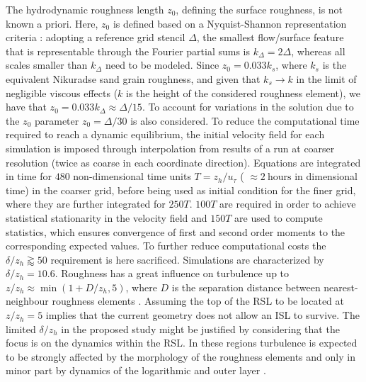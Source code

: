 	The hydrodynamic roughness length $z_0$, defining the surface roughness, is not known a priori. Here, $z_0$ is defined based on a Nyquist-Shannon representation criteria \citep{Shannon1949}: adopting a reference grid stencil $\Delta$, the smallest flow/surface feature that is representable through the Fourier partial sums is $k_{\Delta} = 2\Delta$, whereas all scales smaller than $k_{\Delta}$ need to be modeled. 
	Since $z_0 = 0.033 k_s$, where $k_s$ is the equivalent Nikuradse sand grain roughness, and given that $k_s \rightarrow k$ in the limit of negligible viscous effects ($k$ is the height of the considered roughness element), we have that $z_0 = 0.033 k_{\Delta} \approx \Delta/15$. 
	To account for variations in the solution due to the $z_0$ parameter $z_0= \Delta / 30$ is also considered.
	To reduce the computational time required to reach a dynamic equilibrium, the initial velocity field for each simulation is imposed through interpolation from results of a run at coarser resolution (twice as coarse in each coordinate direction). 
	Equations are integrated in time for $480$ non-dimensional time units $T = z_h/u_{\tau}$ ( $\approx 2 \ \mathrm{hours}$ in dimensional time) in the coarser grid, before being used as initial condition for the finer grid, where they are further integrated for $250T$. 
$100T$ are required in order to achieve statistical stationarity in the velocity field and $150T$ are used to compute statistics, which ensures convergence of first and second order moments to the corresponding expected values.
	To further reduce computational costs the $\delta/z_h \gtrapprox 50$ requirement \citep{Jimenez2004} is here sacrificed. Simulations are characterized by $\delta/z_h = 10.6$. Roughness has a great influence on turbulence up to ${z/z_h \approx \min(1+D/z_h,5)}$, where $D$ is the separation distance between nearest-neighbour roughness elements \citep{Raupach1981, Jimenez2004}. Assuming the top of the RSL to be located at $z/z_h=5$ implies that the current geometry does not allow an ISL to survive. 
	The limited $\delta /z_h$ in the proposed study might be justified by considering that the focus is on the dynamics within the RSL.
In these regions turbulence is expected to be strongly affected by the morphology of the roughness elements and only in minor part by dynamics of the logarithmic and outer layer \citep{Anderson2016a}.